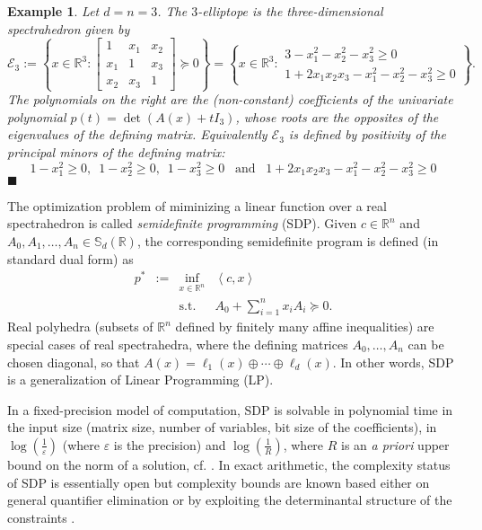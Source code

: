 \documentclass[a4paper,12pt]{article}
\newtheorem{example}{Example}
\newcommand{\R}{\mathbb{R}} %
\newcommand{\sym}{\mathbb{S}} %
\newcommand{\exend}{\hfill $\blacksquare$}
\begin{document}
\begin{example}\label{ell3}
  Let $d=n=3$. The $3$-elliptope is the three-dimensional spectrahedron given by
  $$
  \mathcal{E}_3 :=
  \left\{
  x
  \in \R^3 :
  \begin{bmatrix}
    1 & x_1 & x_2 \\
    x_1 & 1 & x_3 \\
    x_2 & x_3 & 1
  \end{bmatrix}
  \succeq 0
  \right\}
  =
  \left\{
  x
  \in \R^3 :
  \begin{array}{r}
    3-x_1^2-x_2^2-x_3^2 \geq 0 \\
    1+2x_1x_2x_3-x_1^2-x_2^2-x_3^2 \geq 0
  \end{array}
  \right\}.
  $$
  The polynomials on the right are the (non-constant) coefficients of the univariate polynomial
  $p(t) = \det(A(x)+t I_3)$,
  whose roots are the opposites of the eigenvalues of the defining matrix. Equivalently $\mathcal{E}_3$
  is defined by positivity of the principal minors of the defining matrix:
  $$
  1-x_1^2 \geq 0, \,\,\, 1-x_2^2 \geq 0, \,\,\, 1-x_3^2 \geq 0 \,\,\, \text{ and } \,\,\, 1+2x_1x_2x_3-x_1^2-x_2^2-x_3^2 \geq 0
  $$
  \exend
\end{example}

The optimization problem of miminizing a linear function over a real spectrahedron is called \emph{semidefinite programming} (SDP). Given $c \in \R^n$ and $A_0,A_1,\ldots,A_n \in \sym_d(\R)$, the corresponding semidefinite program is defined (in standard dual form) as
\begin{equation}
  \label{SDP}
\begin{array}{rcll}
  p^* & := & \inf_{x \in \R^n} & \left\langle c, x \right\rangle \\
  &    & \text{s.t.}         & A_0+\sum_{i=1}^n x_i A_i \succeq 0.
\end{array}
\end{equation}
Real polyhedra (subsets of $\R^n$ defined by finitely many affine inequalities) are special cases of real
spectrahedra, where the defining matrices $A_0, \ldots, A_n$ can be chosen diagonal, so that $A(x) =
\ell_1(x) \oplus \cdots \oplus \ell_d(x)$. In other words, SDP is a generalization of Linear Programming (LP).

In a fixed-precision model of computation, SDP is solvable in polynomial time in the input size (matrix size,
number of variables, bit size of the coefficients), in $\log(\frac{1}{\varepsilon})$ (where $\varepsilon$ is the
precision) and $\log(\frac{1}{R})$, where $R$ is an {\it a priori} upper bound on the norm of a solution,
cf. \cite[Sec.1.9]{deKlerk}. In exact arithmetic, the complexity status of SDP is essentially open but complexity
bounds are known based either on general quantifier elimination \cite{ramana1997exact,porkolab1997complexity}
or by exploiting the determinantal structure of the constraints \cite{henrion2016exact}.
\end{document}
